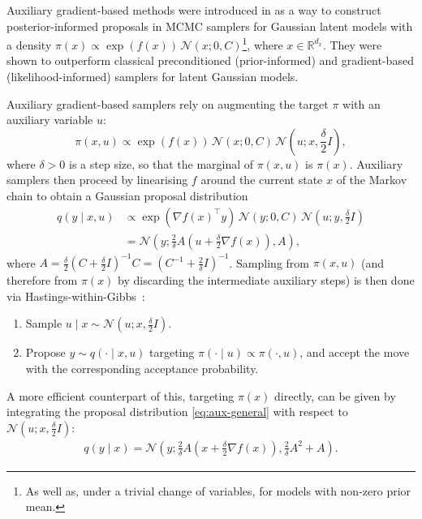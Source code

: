 Auxiliary gradient-based methods were introduced in \citet{titsias2018} as a way to construct posterior-informed proposals in MCMC samplers for Gaussian latent models with a density $\pi(x) \propto \exp(f(x))\,\mathcal{N}(x; 0, C)$\footnote{As well as, under a trivial change of variables, for models with non-zero prior mean.}, where $x \in \mathbb{R}^{d_x}$. They were shown to outperform classical preconditioned (prior-informed) and gradient-based (likelihood-informed) samplers for latent Gaussian models.


Auxiliary gradient-based samplers rely on augmenting the target $\pi$ with an auxiliary variable $u$:
\begin{equation}
    \label{eq:augmented-proposal-general}
    \pi(x, u) \propto \exp(f(x))\,\mathcal{N}(x; 0, C)\, \mathcal{N}\left(u; x, \frac{\delta}{2} I\right),
\end{equation}
where $\delta > 0$ is a step size, so that the marginal of $\pi(x, u)$ is $\pi(x)$. Auxiliary samplers then proceed by linearising $f$ around the current state $x$ of the Markov chain to obtain a Gaussian proposal distribution
\begin{equation}
    \label{eq:aux-general}
    \begin{split}
        q(y \mid x, u)
        &\propto \exp(\nabla f(x)^{\top}y)\,\mathcal{N}(y; 0, C)\, \mathcal{N}\left(u; y, \frac{\delta}{2} I\right)\\
        &= \mathcal{N}\left(y; \frac{2}{\delta} A \left(u + \frac{\delta}{2} \nabla f(x)\right), A\right),
    \end{split}
\end{equation}
where $A = \frac{\delta}{2} (C + \frac{\delta}{2} I)^{-1} C = (C^{-1} + \frac{2}{\delta} I)^{-1}$. Sampling from $\pi(x, u)$ (and therefore from $\pi(x)$ by discarding the intermediate auxiliary steps) is then done via Hastings-within-Gibbs~\citep{muller1993}:
\begin{enumerate}
    \item Sample $u \mid x \sim \mathcal{N}(u; x, \frac{\delta}{2} I)$.
    \item Propose $y \sim q(\cdot \mid x, u)$ targeting $\pi(\cdot \mid u) \propto \pi(\cdot, u)$, and accept the move with the corresponding acceptance probability.
\end{enumerate}
A more efficient counterpart of this, targeting $\pi(x)$ directly, can be given by integrating the proposal distribution \eqref{eq:aux-general} with respect to $\mathcal{N}(u; x, \frac{\delta}{2} I)$:
\begin{align}
    \label{eq:marginal-general}
    q(y \mid x) = \mathcal{N}\left(y; \frac{2}{\delta} A \left(x + \frac{\delta}{2} \nabla f(x)\right), \frac{2}{\delta} A^2 + A\right).
\end{align}

